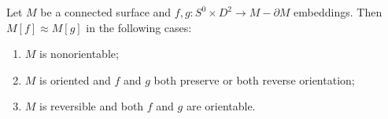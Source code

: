 Let $M$ be a connected surface and $f, g: S^0 \times D^2 \to M - \partial M$ embeddings. Then $M[f] \approx M[g]$ in the following cases:
\begin{enumerate}
\item[(a)] $M$ is nonorientable;
\item[(b)] $M$ is oriented and $f$ and $g$ both preserve or both reverse orientation;
\item[(c)] $M$ is reversible and both $f$ and $g$ are orientable.
\end{enumerate}
